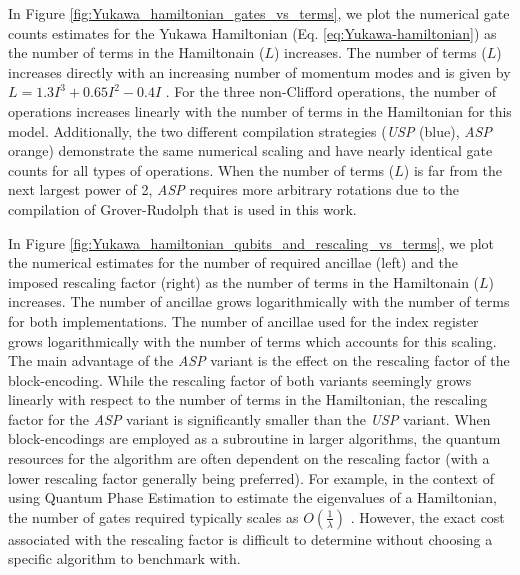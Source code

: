 In Figure \ref{fig:Yukawa_hamiltonian_gates_vs_terms}, we plot the numerical gate counts estimates for the Yukawa Hamiltonian (Eq. \ref{eq:Yukawa-hamiltonian})  as the number of terms in the Hamiltonain ($L$) increases.
The number of terms ($L$) increases directly with an increasing number of momentum modes and is given by $L = 1.3I^3 + 0.65I^2 - 0.4I $  .
For the three non-Clifford operations, the number of operations increases linearly with the number of terms in the Hamiltonian for this model.
Additionally, the two different compilation strategies (\textit{USP} (blue), \textit{ASP} orange) demonstrate the same numerical scaling and have nearly identical gate counts for all types of operations.
When the number of terms ($L$) is far from the next largest power of 2, \textit{ASP} requires more arbitrary rotations due to the compilation of Grover-Rudolph that is used in this work.

In Figure \ref{fig:Yukawa_hamiltonian_qubits_and_rescaling_vs_terms}, we plot the numerical estimates for the number of required ancillae (left) and the imposed rescaling factor (right) as the number of terms in the Hamiltonain ($L$) increases.
The number of ancillae grows logarithmically with the number of terms for both implementations.
The number of ancillae used for the index register grows logarithmically with the number of terms which accounts for this scaling.
The main advantage of the \textit{ASP} variant is the effect on the rescaling factor of the block-encoding.
While the rescaling factor of both variants seemingly grows linearly with respect to the number of terms in the Hamiltonian, the rescaling factor for the \textit{ASP} variant is significantly smaller than the \textit{USP} variant.
When block-encodings are employed as a subroutine in larger algorithms, the quantum resources for the algorithm are often dependent on the rescaling factor (with a lower rescaling factor generally being preferred).
For example, in the context of using Quantum Phase Estimation to estimate the eigenvalues of a Hamiltonian, the number of gates required typically scales as $O(\frac{1}{\lambda})$ \cite{babbush2018encoding}. 
However, the exact cost associated with the rescaling factor is difficult to determine without choosing a specific algorithm to benchmark with.

